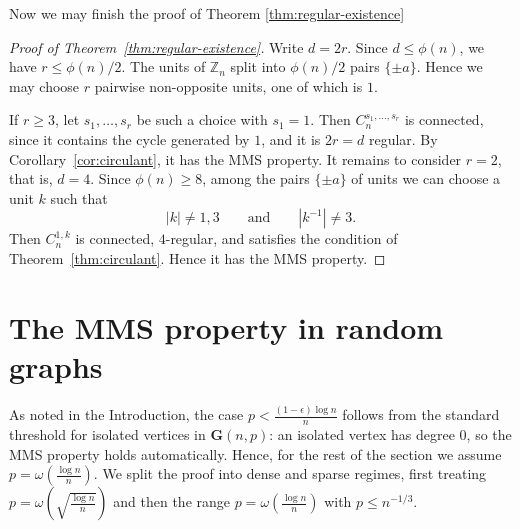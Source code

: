 \documentclass[12pt,UKenglish]{amsart}
\theoremstyle{plain}
\theoremstyle{definition}
\theoremstyle{remark}
\begin{document}
Now we may finish the proof of Theorem \ref{thm:regular-existence}
\begin{proof}[Proof of Theorem~\ref{thm:regular-existence}]
  Write $d=2r$. Since $d\le \phi(n)$, we have $r\le \phi(n)/2$. The units of $\mathbb{Z}_n$ split into $\phi(n)/2$ pairs $\{\pm a\}$. Hence we may choose $r$ pairwise non-opposite units, one of which is $1$.

  If $r\ge 3$, let $s_1,\dots,s_r$ be such a choice with $s_1=1$. Then $C_n^{s_1,\dots,s_r}$ is connected, since it contains the cycle generated by $1$, and it is $2r=d$ regular. By Corollary~\ref{cor:circulant}, it has the MMS property. It remains to consider $r=2$, that is, $d=4$. Since $\phi(n)\ge 8$, among the pairs $\{\pm a\}$ of units we can choose a unit $k$ such that
  \[
    |k|\neq 1,3
    \qquad\text{and}\qquad
    |k^{-1}|\neq 3.
  \]
  Then $C_n^{1,k}$ is connected, $4$-regular, and satisfies the condition of Theorem~\ref{thm:circulant}. Hence it has the MMS property.
\end{proof}

\section{The MMS property in random graphs}
As noted in the Introduction, the case $p<\frac{(1-\epsilon)\log n}{n}$ follows from the standard threshold for isolated vertices in $\mathbf{G}(n,p)$: an isolated vertex has degree $0$, so the MMS property holds automatically. Hence, for the rest of the section we assume $p=\omega\left({\frac{\log n}{n}}\right)$. We split the proof into dense and sparse regimes, first treating $p=\omega\left({\sqrt{\frac{\log n}{n}}}\right)$ and then the range $p=\omega\left({\frac{\log n}{n}}\right)$ with $p\leq n^{-1/3}$.
\end{document}
